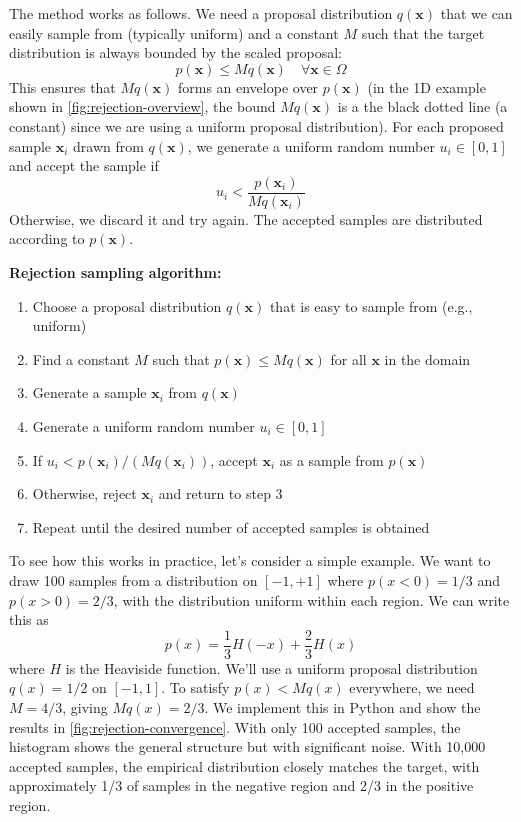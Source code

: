 The method works as follows. We need a proposal distribution $q(\mathbf{x})$ that we can easily sample from (typically uniform) and a constant $M$ such that the target distribution is always bounded by the scaled proposal:
\begin{equation}
    p(\mathbf{x}) \le M q(\mathbf{x}) \quad \forall \mathbf{x} \in \Omega
\end{equation}
This ensures that $M q(\mathbf{x})$ forms an envelope over $p(\mathbf{x})$ (in the 1D example shown in \autoref{fig:rejection-overview}, the bound $M q(\mathbf{x})$ is a the black dotted line (a constant) since we are using a uniform proposal distribution). For each proposed sample $\mathbf{x}_i$ drawn from $q(\mathbf{x})$, we generate a uniform random number $u_i \in [0,1]$ and accept the sample if
\begin{equation}
u_i < \frac{p(\mathbf{x}_i)}{M q(\mathbf{x}_i)}
\end{equation}
Otherwise, we discard it and try again. The accepted samples are distributed according to $p(\mathbf{x})$.

\begin{algorithmBox}
    \textbf{Rejection sampling algorithm:}
    \begin{enumerate}
        \item Choose a proposal distribution $q(\mathbf{x})$ that is easy to sample from (e.g., uniform)
        \item Find a constant $M$ such that $p(\mathbf{x}) \le M q(\mathbf{x})$ for all $\mathbf{x}$ in the domain
        \item Generate a sample $\mathbf{x}_i$ from $q(\mathbf{x})$
        \item Generate a uniform random number $u_i \in [0,1]$
        \item If $u_i < p(\mathbf{x}_i)/(M q(\mathbf{x}_i))$, accept $\mathbf{x}_i$ as a sample from $p(\mathbf{x})$
        \item Otherwise, reject $\mathbf{x}_i$ and return to step 3
        \item Repeat until the desired number of accepted samples is obtained
    \end{enumerate}
\end{algorithmBox}

To see how this works in practice, let's consider a simple example. We want to draw 100 samples from a distribution on $[-1, +1]$ where $p(x < 0) = 1/3$ and $p(x > 0) = 2/3$, with the distribution uniform within each region. We can write this as
\begin{equation}
p(x) = \frac{1}{3} H(-x) + \frac{2}{3} H(x)
\end{equation}
where $H$ is the Heaviside function. We'll use a uniform proposal distribution $q(x) = 1/2$ on $[-1,1]$. To satisfy $p(x) < M q(x)$ everywhere, we need $M = 4/3$, giving $M q(x) = 2/3$. We implement this in Python and show the results in \autoref{fig:rejection-convergence}. With only 100 accepted samples, the histogram shows the general structure but with significant noise. With 10,000 accepted samples, the empirical distribution closely matches the target, with approximately 1/3 of samples in the negative region and 2/3 in the positive region.

